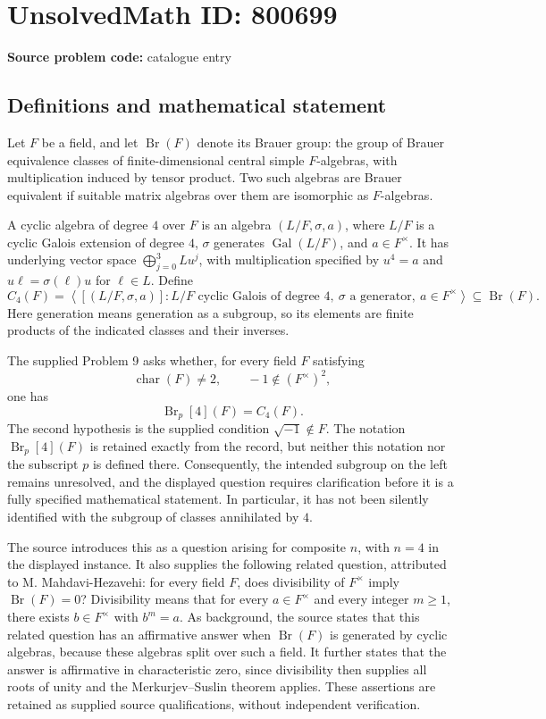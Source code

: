 \documentclass[11pt]{article}
\begin{document}
\section*{UnsolvedMath ID: 800699}
\textbf{Source problem code:} catalogue entry
\subsection{Definitions and mathematical statement}
Let \(F\) be a field, and let \(\operatorname{Br}(F)\) denote its Brauer group: the group of Brauer equivalence classes of finite-dimensional central simple \(F\)-algebras, with multiplication induced by tensor product. Two such algebras are Brauer equivalent if suitable matrix algebras over them are isomorphic as \(F\)-algebras.

A cyclic algebra of degree \(4\) over \(F\) is an algebra \((L/F,\sigma,a)\), where \(L/F\) is a cyclic Galois extension of degree \(4\), \(\sigma\) generates \(\operatorname{Gal}(L/F)\), and \(a\in F^\times\). It has underlying vector space \(\bigoplus_{j=0}^{3}Lu^j\), with multiplication specified by \(u^4=a\) and \(u\ell=\sigma(\ell)u\) for \(\ell\in L\). Define
\[
C_4(F)=\left\langle [(L/F,\sigma,a)] : L/F\text{ cyclic Galois of degree }4,\ \sigma\text{ a generator},\ a\in F^\times\right\rangle
\subseteq\operatorname{Br}(F).
\]
Here generation means generation as a subgroup, so its elements are finite products of the indicated classes and their inverses.

The supplied Problem 9 asks whether, for every field \(F\) satisfying
\[
\operatorname{char}(F)\ne 2,\qquad -1\notin(F^\times)^2,
\]
one has
\[
\operatorname{Br}_p[4](F)=C_4(F).
\]
The second hypothesis is the supplied condition \(\sqrt{-1}\notin F\). The notation \(\operatorname{Br}_p[4](F)\) is retained exactly from the record, but neither this notation nor the subscript \(p\) is defined there. Consequently, the intended subgroup on the left remains unresolved, and the displayed question requires clarification before it is a fully specified mathematical statement. In particular, it has not been silently identified with the subgroup of classes annihilated by \(4\).

The source introduces this as a question arising for composite \(n\), with \(n=4\) in the displayed instance. It also supplies the following related question, attributed to M. Mahdavi-Hezavehi: for every field \(F\), does divisibility of \(F^\times\) imply \(\operatorname{Br}(F)=0\)? Divisibility means that for every \(a\in F^\times\) and every integer \(m\geq1\), there exists \(b\in F^\times\) with \(b^m=a\). As background, the source states that this related question has an affirmative answer when \(\operatorname{Br}(F)\) is generated by cyclic algebras, because these algebras split over such a field. It further states that the answer is affirmative in characteristic zero, since divisibility then supplies all roots of unity and the Merkurjev--Suslin theorem applies. These assertions are retained as supplied source qualifications, without independent verification.
\end{document}
